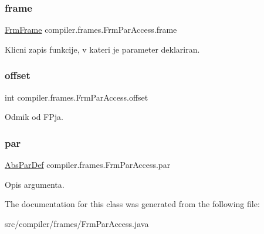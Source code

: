 \subsubsection{\texorpdfstring{frame}{frame}}
{\footnotesize\ttfamily \hyperlink{classcompiler_1_1frames_1_1_frm_frame}{Frm\+Frame} compiler.\+frames.\+Frm\+Par\+Access.\+frame}

Klicni zapis funkcije, v kateri je parameter deklariran. \mbox{\label{classcompiler_1_1frames_1_1_frm_par_access_a81316f8d58e59c1de53c1fe9af3f78a9}} 
\subsubsection{\texorpdfstring{offset}{offset}}
{\footnotesize\ttfamily int compiler.\+frames.\+Frm\+Par\+Access.\+offset}

Odmik od F\+Pja. \mbox{\label{classcompiler_1_1frames_1_1_frm_par_access_aeebc6111a12c1f3539d4039a11fd7d7c}} 
\subsubsection{\texorpdfstring{par}{par}}
{\footnotesize\ttfamily \hyperlink{classcompiler_1_1abstr_1_1tree_1_1def_1_1_abs_par_def}{Abs\+Par\+Def} compiler.\+frames.\+Frm\+Par\+Access.\+par}

Opis argumenta. 

The documentation for this class was generated from the following file\+:\begin{DoxyCompactItemize}
\item 
src/compiler/frames/Frm\+Par\+Access.\+java\end{DoxyCompactItemize}
